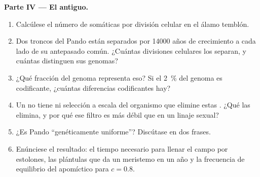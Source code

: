 \begin{problem}
\medskip
\noindent\textbf{Parte IV --- El  antiguo.}
\begin{enumerate}[resume]
  \item Calcúlese el número de  somáticas por división celular
        en el álamo temblón.
  \item Dos troncos del  Pando están separados por \num{14000} años
        de crecimiento a cada lado de su antepasado común. ¿Cuántas
        divisiones celulares los separan, y cuántas  distinguen
        sus genomas?
  \item ¿Qué fracción del genoma representa eso? Si el \qty{2}{\%} del
        genoma es codificante, ¿cuántas diferencias codificantes hay?
  \item Un  no tiene  ni selección a escala del organismo que
        elimine estas . ¿Qué las elimina, y por qué ese filtro
        es más débil que en un linaje sexual?
  \item ¿Es Pando ``genéticamente uniforme''? Discútase en dos frases.
  \item Enúnciese el resultado: el tiempo necesario para llenar el campo
        por estolones, las plántulas que da un meristemo en un año y la
        frecuencia de equilibrio del apomíctico para $c = 0.8$.
\end{enumerate}
\end{problem}

